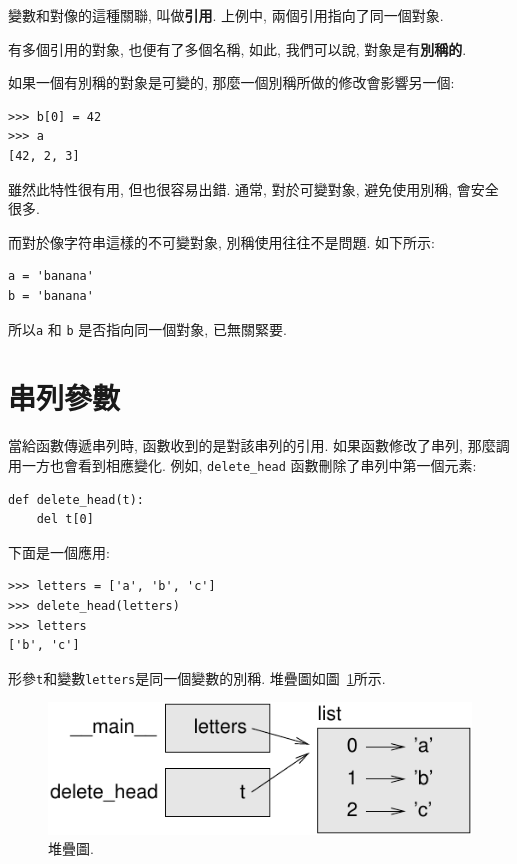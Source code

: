 \documentclass[10pt]{book}
\begin{document}
變數和對像的這種關聯, 叫做{\bf 引用}.
上例中, 兩個引用指向了同一個對象. 

有多個引用的對象, 也便有了多個名稱, 
如此, 我們可以說, 對象是有{\bf 別稱的}.

如果一個有別稱的對象是可變的, 那麼一個別稱所做的修改會影響另一個:

\begin{verbatim}
>>> b[0] = 42
>>> a
[42, 2, 3]
\end{verbatim}
%

雖然此特性很有用, 但也很容易出錯. 
通常, 對於可變對象, 避免使用別稱, 會安全很多. 

而對於像字符串這樣的不可變對象, 別稱使用往往不是問題. 
如下所示:

\begin{verbatim}
a = 'banana'
b = 'banana'
\end{verbatim}
%
所以{\tt a} 和 {\tt b} 是否指向同一個對象, 已無關緊要. 


\section{串列參數}
\label{list.arguments}

當給函數傳遞串列時, 函數收到的是對該串列的引用. 
如果函數修改了串列, 那麼調用一方也會看到相應變化. 
例如, \verb"delete_head" 函數刪除了串列中第一個元素:

\begin{verbatim}
def delete_head(t):
    del t[0]
\end{verbatim}
%

下面是一個應用:

\begin{verbatim}
>>> letters = ['a', 'b', 'c']
>>> delete_head(letters)
>>> letters
['b', 'c']
\end{verbatim}
%
形參{\tt t}和變數{\tt letters}是同一個變數的別稱. 
堆疊圖如圖~\ref{fig.stack5}所示.

\begin{figure}
\centerline
{\includegraphics[scale=0.8]{figs/stack5.pdf}}
\caption{堆疊圖.}
\label{fig.stack5}
\end{figure}
\end{document}
